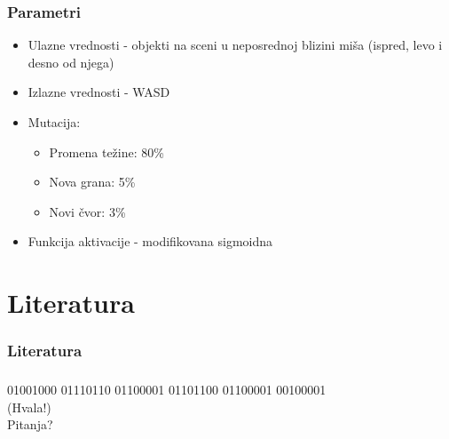 \documentclass{beamer}
\begin{document}
\begin{frame} 
\frametitle{Parametri}
\begin{itemize}
\item Ulazne vrednosti - objekti na sceni u neposrednoj blizini miša (ispred, levo i desno od njega)
\item Izlazne vrednosti - WASD
\item Mutacija:
\begin{itemize}
\item Promena težine: 80\%
\item Nova grana: 5\%
\item Novi čvor: 3\%
\end{itemize}
\item Funkcija aktivacije - modifikovana sigmoidna
\end{itemize}
\end{frame}

\section{Literatura}
\begin{frame}

\nocite{NEAT}

\frametitle{Literatura}


\end{frame}

\begin{frame}
\frametitle{}
\begin{center}
{\Huge 01001000 01110110 01100001 01101100 01100001 00100001} \\
{\Huge (Hvala!)} \\ 
\bigskip
\bigskip
{\Huge Pitanja?}
\end{center}
\end{frame}
\end{document}
